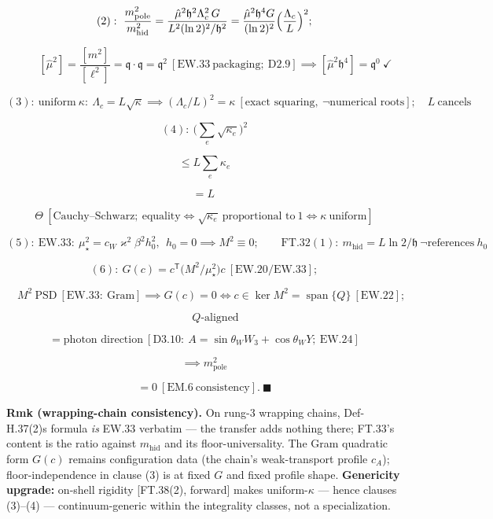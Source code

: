 \begin{theorem}
\[
(2):\ \frac{m_{\mathrm{pole}}^2}{m_{\mathrm{hid}}^2}=\frac{\hat\mu^2\mathfrak h^2\Lambda_c^2\,G}{L^2(\ln2)^2/\mathfrak h^2}=\frac{\hat\mu^2\mathfrak h^4G}{(\ln2)^2}\Bigl(\frac{\Lambda_c}{L}\Bigr)^2;
\]

\[
\qquad [\hat\mu^2]=\frac{[m^2]}{[\ell^2]}=\mathfrak q\cdot\mathfrak q=\mathfrak q^2\ [\mathrm{EW.33}\ \text{packaging};\ \mathrm{D2.9}]\implies[\hat\mu^2\mathfrak h^4]=\mathfrak q^0\ \checkmark
\]

\[
(3):\ \text{uniform}\ \kappa:\ \Lambda_c=L\sqrt\kappa\implies(\Lambda_c/L)^2=\kappa\ [\text{exact squaring},\ \neg\text{numerical roots}];\quad L\ \text{cancels}
\]

\[
(4):\ \bigl(\sum_e\sqrt{\kappa_e}\bigr)^2
\]

\[
\le L\sum_e\kappa_e
\]

\[
= L\,
\]

\[
\Theta\ [\text{Cauchy–Schwarz};\ \text{equality}\iff\sqrt{\kappa_e}\ \text{proportional to}\ 1\iff\kappa\ \text{uniform}]
\]

\[
(5):\ \mathrm{EW.33}:\ \mu_\star^2=c_W\varkappa^2\beta^2h_0^2,\ \ h_0=0\implies M^2\equiv0;\qquad\mathrm{FT.32}(1):\ m_{\mathrm{hid}}=L\ln2/\mathfrak h\ \neg\text{references}\ h_0
\]

\[
(6):\ G(c)=c^{\mathsf T}\bigl(M^2/\mu_\star^2\bigr)c\ [\mathrm{EW.20}/\mathrm{EW.33}];
\]

\[
\quad M^2\ \text{PSD}\ [\mathrm{EW.33}:\ \text{Gram}]\implies G(c)=0\iff c\in\ker M^2=\operatorname{span}\{Q\}\ [\mathrm{EW.22}];
\]

\[
\qquad Q\text{-aligned}
\]

\[
= \text{photon direction}\ [\mathrm{D3.10}:\ A=\sin\theta_WW_3+\cos\theta_WY;\ \mathrm{EW.24}]
\]

\[
\implies m_{\mathrm{pole}}^2
\]

\[
= 0\ [\mathrm{EM.6}\ \text{consistency}].\ \blacksquare
\]

\textbf{Rmk (wrapping-chain consistency).} On rung-3 wrapping chains, Def-H.37(2)s formula \textit{is} EW.33 verbatim — the transfer adds nothing there; FT.33's content is the ratio against $m_{\mathrm{hid}}$ and its floor-universality. The Gram quadratic form $G(c)$ remains configuration data (the chain's weak-transport profile $c_A$); floor-independence in clause (3) is at fixed $G$ and fixed profile shape. \textbf{Genericity upgrade:} on-shell rigidity [FT.38(2), forward] makes uniform-$\kappa$ — hence clauses (3)–(4) — continuum-generic within the integrality classes, not a specialization.


\end{theorem}
